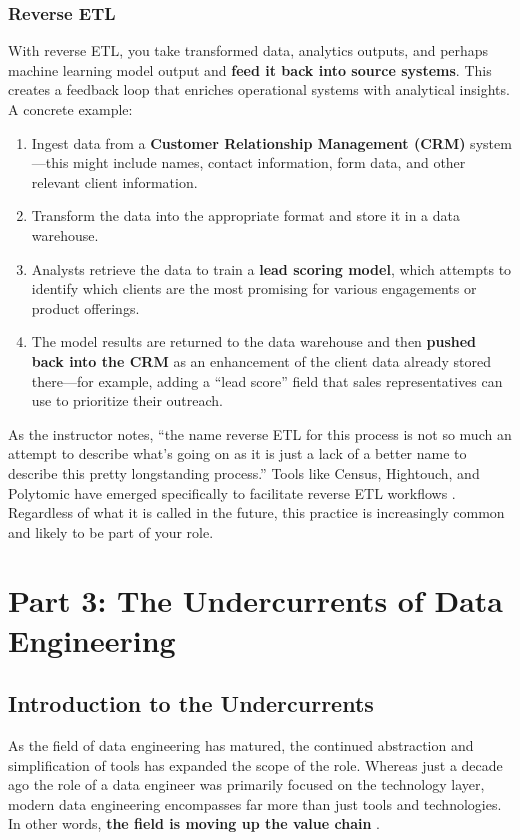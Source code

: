 \documentclass{article}
\begin{document}
\subsubsection{Reverse ETL}
With reverse ETL, you take transformed data, analytics outputs, and perhaps machine learning model output and \textbf{feed it back into source systems}. This creates a feedback loop that enriches operational systems with analytical insights. A concrete example:
\begin{enumerate}
    \item Ingest data from a \textbf{Customer Relationship Management (CRM)} system---this might include names, contact information, form data, and other relevant client information.
    \item Transform the data into the appropriate format and store it in a data warehouse.
    \item Analysts retrieve the data to train a \textbf{lead scoring model}, which attempts to identify which clients are the most promising for various engagements or product offerings.
    \item The model results are returned to the data warehouse and then \textbf{pushed back into the CRM} as an enhancement of the client data already stored there---for example, adding a ``lead score'' field that sales representatives can use to prioritize their outreach.
\end{enumerate}

As the instructor notes, ``the name reverse ETL for this process is not so much an attempt to describe what's going on as it is just a lack of a better name to describe this pretty longstanding process.'' Tools like Census, Hightouch, and Polytomic have emerged specifically to facilitate reverse ETL workflows \cite{reis2022fundamentals}. Regardless of what it is called in the future, this practice is increasingly common and likely to be part of your role.

\newpage

\section{Part 3: The Undercurrents of Data Engineering}

\subsection{Introduction to the Undercurrents}
As the field of data engineering has matured, the continued abstraction and simplification of tools has expanded the scope of the role. Whereas just a decade ago the role of a data engineer was primarily focused on the technology layer, modern data engineering encompasses far more than just tools and technologies. In other words, \textbf{the field is moving up the value chain} \cite{reis2022fundamentals}.
\end{document}

